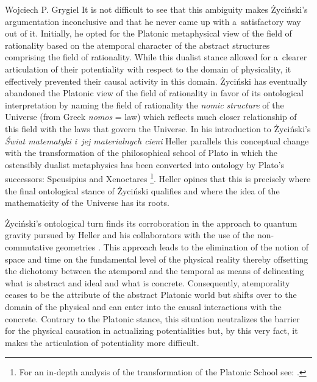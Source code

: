 \begin{artengenv}{Wojciech P. Grygiel}
It is not difficult to see that this ambiguity makes Życiński's argumentation inconclusive and that he never came up with a~satisfactory way out of it. Initially, he opted for the Platonic metaphysical view of the field of rationality based on the atemporal character of the abstract structures comprising the field of rationality. While this dualist stance allowed for a~clearer articulation of their potentiality with respect to the domain of physicality, it effectively prevented their causal activity in this domain. Życiński 
\parencite*[][pp.58–59]{zycinski_pole_2006} %
 has eventually abandoned the Platonic view of the field of rationality in favor of its ontological interpretation by naming the field of rationality the \textit{nomic structure} of the Universe (from Greek \textit{nomos} = law) which reflects much closer relationship of this field with the laws that govern the Universe. In his introduction to Życiński's \textit{Świat matematyki i~jej materialnych cieni} Heller parallels this conceptual change with the transformation of the philosophical school of Plato in which the ostensibly dualist metaphysics has been converted into ontology by Plato's successors: Speusipius and Xenoctares 
\parencite[][]{zycinski_wstep_2013}%
\footnote{For an in-depth analysis of the transformation of the Platonic School see: 
\parencites[][]{dembinski_pozny_2010}[see also 201][]{dembinski_2015}[][]{Dembinski_2019}.%
}. Heller opines that this is precisely where the final ontological stance of Życiński qualifies and where the idea of the mathematicity of the Universe has its roots.



Życiński's ontological turn finds its corroboration in the approach to quantum gravity pursued by Heller and his collaborators with the use of the non-commutative geometries 
\parencites[][]{heller_emergence_1998}[][pp.115–122]{heller_poczatek_2002}. %
 This approach leads to the elimination of the notion of space and time on the fundamental level of the physical reality thereby offsetting the dichotomy between the atemporal and the temporal as means of delineating what is abstract and ideal and what is concrete. Consequently, atemporality ceases to be the attribute of the abstract Platonic world but shifts over to the domain of the physical and can enter into the causal interactions with the concrete. Contrary to the Platonic stance, this situation neutralizes the barrier for the physical causation in actualizing potentialities but, by this very fact, it makes the articulation of potentiality more difficult.




\end{artengenv}
